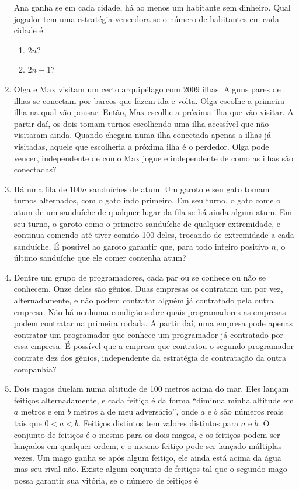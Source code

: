 \documentclass{article}
\begin{document}
\begin{enumerate}
    Ana ganha se em cada cidade, há ao menos um habitante sem dinheiro. Qual jogador tem uma estratégia vencedora se o número de habitantes em cada cidade é
    
    \begin{enumerate}
    \item $2n$?
    
    \item $2n-1$?
    \end{enumerate}
    
    \item Olga e Max visitam um certo arquipélago com 2009 ilhas. Alguns pares de ilhas se conectam por barcos que fazem ida e volta. Olga escolhe a primeira ilha na qual vão pousar. Então, Max escolhe a próxima ilha que vão visitar. A partir daí, os dois tomam turnos escolhendo uma ilha acessível que não visitaram ainda. Quando chegam numa ilha conectada apenas a ilhas já visitadas, aquele que escolheria a próxima ilha é o perdedor. Olga pode vencer, independente de como Max jogue e independente de como as ilhas são conectadas?
    
    \item Há uma fila de $100n$ sanduíches de atum. Um garoto e seu gato tomam turnos alternados, com o gato indo primeiro. Em seu turno, o gato come o atum de um sanduíche de qualquer lugar da fila se há ainda algum atum. Em seu turno, o garoto como o primeiro sanduíche de qualquer extremidade, e continua comendo até tiver comido 100 deles, trocando de extremidade a cada sanduíche. É possível ao garoto garantir que, para todo inteiro positivo $n$, o último sanduíche que ele comer contenha atum?
    
    \newpage
    
    \item Dentre um grupo de programadores, cada par ou se conhece ou não se conhecem. Onze deles são gênios. Duas empresas os contratam um por vez, alternadamente, e não podem contratar alguém já contratado pela outra empresa. Não há nenhuma condição sobre quais programadores as empresas podem contratar na primeira rodada. A partir daí, uma empresa pode apenas contratar um programador que conhece um programador já contratado por essa empresa. É possível que a empresa que contratou o segundo programador contrate dez dos gênios, independente da estratégia de contratação da outra companhia?
    
    \item Dois magos duelam numa altitude de 100 metros acima do mar. Eles lançam feitiços alternadamente, e cada feitiço é da forma ``diminua minha altitude em $a$ metros e em $b$ metros a de meu adversário'', onde $a$ e $b$ são números reais tais que $0<a<b$. Feitiços distintos tem valores distintos para $a$ e $b$. O conjunto de feitiços é o mesmo para os dois magos, e os feitiços podem ser lançados em qualquer ordem, e o mesmo feitiço pode ser lançado múltiplas vezes. Um mago ganha se após algum feitiço, ele ainda está acima da água mas seu rival não. Existe algum conjunto de feitiços tal que o segundo mago possa garantir sua vitória, se o número de feitiços é
    

\end{enumerate}
\end{document}
